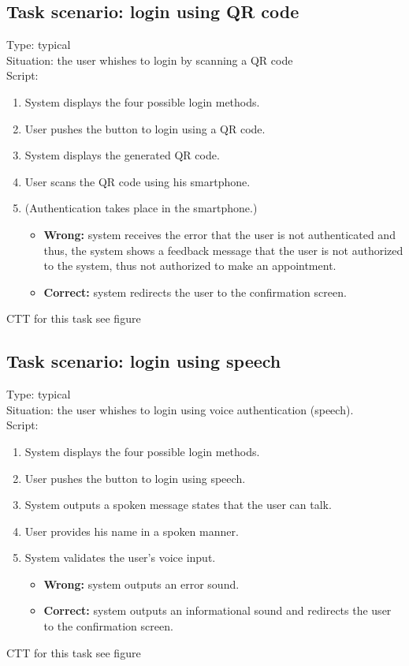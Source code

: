 \documentclass[11pt, a4paper,svglistings]{report}
\begin{document}
\subsection{Task scenario: login using QR code}

Type: typical \\
Situation: the user whishes to login by scanning a QR code \\
Script:
\begin{enumerate}
\item System displays the four possible login methods.
\item User pushes the button to login using a QR code.
\item System displays the generated QR code.
\item User scans the QR code using his smartphone.
\item (Authentication takes place in the smartphone.)
\begin{itemize}
\item \textbf{Wrong:} system receives the error that the user is not authenticated and thus, the system shows a feedback message that the user is not authorized to the system, thus not authorized to make an appointment.
\item \textbf{Correct:} system redirects the user to the confirmation screen.
\end{itemize}
\end{enumerate}
CTT for this task see figure %

\subsection{Task scenario: login using speech}

Type: typical \\
Situation: the user whishes to login using voice authentication (speech). \\
Script:
\begin{enumerate}
\item System displays the four possible login methods.
\item User pushes the button to login using speech.
\item System outputs a spoken message states that the user can talk.
\item User provides his name in a spoken manner.
\item System validates the user's voice input.
\begin{itemize}
\item \textbf{Wrong:} system outputs an error sound.
\item \textbf{Correct:} system outputs an informational sound and redirects the user to the  confirmation screen.
\end{itemize}
\end{enumerate}
CTT for this task see figure %
\end{document}
